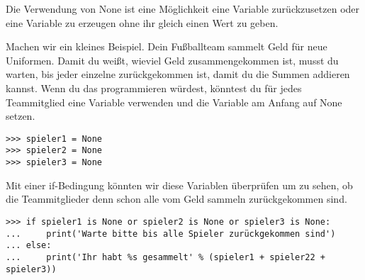 Die Verwendung von None ist eine Möglichkeit eine Variable zurückzusetzen oder eine Variable zu erzeugen ohne ihr gleich einen Wert zu geben.
\par
Machen wir ein kleines Beispiel. Dein Fußballteam sammelt Geld für neue Uniformen. Damit du weißt, wieviel Geld zusammengekommen ist, musst du warten, bis jeder einzelne zurückgekommen ist, damit du die Summen addieren kannst. Wenn du das programmieren würdest, könntest du für jedes Teammitglied eine Variable verwenden und die Variable am Anfang auf None setzen.

\begin{Verbatim}[frame=single]
>>> spieler1 = None
>>> spieler2 = None
>>> spieler3 = None
\end{Verbatim}

Mit einer if-Bedingung könnten wir diese Variablen überprüfen um zu sehen, ob die Teammitglieder denn schon alle vom Geld sammeln zurückgekommen sind.

\begin{Verbatim}[frame=single]
>>> if spieler1 is None or spieler2 is None or spieler3 is None:
...     print('Warte bitte bis alle Spieler zurückgekommen sind')
... else:
...     print('Ihr habt %s gesammelt' % (spieler1 + spieler22 + spieler3))
\end{Verbatim}

